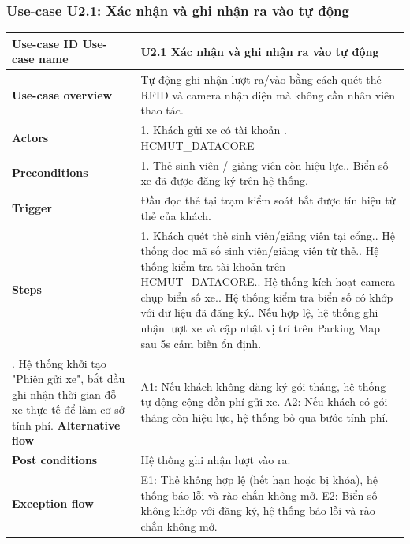 \subsubsection{Use-case U2.1: Xác nhận và ghi nhận ra vào tự động}
\vspace{0.5cm}
\noindent
\begin{tabularx}{\textwidth}{|>{\raggedright\arraybackslash}p{4cm}|X|}
\hline
\textbf{Use-case ID} \newline \textbf{Use-case name} & U2.1 \newline \textbf{Xác nhận và ghi nhận ra vào tự động} \\ \hline
\textbf{Use-case overview} & Tự động ghi nhận lượt ra/vào bằng cách quét thẻ RFID và camera nhận diện mà không cần nhân viên thao tác.\\ \hline
\textbf{Actors} & 1. Khách gửi xe có tài khoản \newline 2. HCMUT\_DATACORE  \\ \hline
\textbf{Preconditions} &
1. Thẻ sinh viên / giảng viên còn hiệu lực.\newline
2. Biển số xe đã được đăng ký trên hệ thống. \\ \hline
\textbf{Trigger} & Đầu đọc thẻ tại trạm kiểm soát bắt được tín hiệu từ thẻ của khách. \\ \hline

\textbf{Steps} &
1. Khách quét thẻ sinh viên/giảng viên tại cổng.\newline
2. Hệ thống đọc mã số sinh viên/giảng viên từ thẻ.\newline
3. Hệ thống kiểm tra tài khoản trên HCMUT\_DATACORE.\newline
4. Hệ thống kích hoạt camera chụp biển số xe.\newline
5. Hệ thống kiểm tra biển số có khớp với dữ liệu đã đăng ký.\newline
6. Nếu hợp lệ, hệ thống ghi nhận lượt xe và cập nhật vị trí trên Parking Map sau 5s cảm biến ổn định. \\ \hline
7. Hệ thống khởi tạo "Phiên gửi xe", bắt đầu ghi nhận thời gian đỗ xe thực tế để làm cơ sở tính phí.
\textbf{Alternative flow} &
A1: Nếu khách không đăng ký gói tháng, hệ thống tự động cộng dồn phí gửi xe.\newline
A2: Nếu khách có gói tháng còn hiệu lực, hệ thống bỏ qua bước tính phí. \\ \hline

\textbf{Post conditions} & Hệ thống ghi nhận lượt vào ra. \\ \hline

\textbf{Exception flow} &
E1: Thẻ không hợp lệ (hết hạn hoặc bị khóa), hệ thống báo lỗi và rào chắn không mở.\newline
E2: Biển số không khớp với đăng ký, hệ thống báo lỗi và rào chắn không mở. \\ \hline
\end{tabularx}


